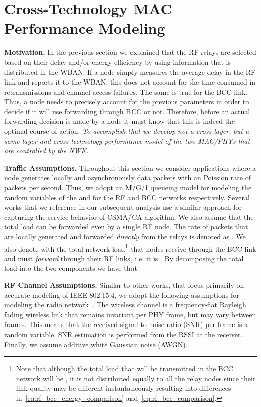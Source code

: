 \documentclass[10pt]{IEEEtran}
\newcounter{section:outage-analysis}
\begin{document}
\section{Cross-Technology MAC Performance Modeling}
\label{section:modeling-approach}
\textbf{Motivation.} In the previous section we explained that the RF relays are selected based on their delay and/or energy efficiency by using information that is distributed in the WBAN. If a node simply measures the average delay in the RF link and reports it to the WBAN, this does not account for the time consumed in retransmissions and channel access failures. The same is true for the BCC link. Thus, a node needs to precisely account for the previous parameters in order to decide if it will use forwarding through BCC or not. Therefore, before an actual forwarding decision is made by a node it must know that this is indeed the optimal course of action.
\textit{To accomplish that we develop not a cross-layer, but a same-layer and cross-technology performance model of the two MAC/PHYs that are controlled by the NWK.}

\textbf{Traffic Assumptions.} Throughout this section we consider applications where a node  generates locally and asynchronously data packets with an Poission rate of  packets per second. Thus, we adopt an M/G/1 queueing model for modeling the random variables of the  and  for the RF and BCC networks respectively. Several works that we reference in our subsequent analysis use a similar approach for capturing the service behavior of CSMA/CA algorithm. We also assume that the total load  can be forwarded even by a single RF node. The rate of packets that are locally generated and forwarded \textit{directly} from the relays is denoted as . We also denote with  the total network load\footnote{Note that although the total load that will be transmitted in the BCC network will be , it is not distributed equally to all the relay nodes since their link quality may be different instantaneously resulting into differences in~\eqref{eq:rf_bcc_energy_comparison} and~\eqref{eq:rf_bcc_comparison}.} that nodes receive through the BCC link and must \textit{forward} through their RF links, i.e. it is .  By decomposing the total load into the two components we have that 

\textbf{RF Channel Assumptions.} Similar to other works, that focus primarily on accurate modeling of IEEE 802.15.4, we adopt the following assumptions for modeling the radio network~\cite{kim2008:performance-802154}. The wireless channel is a frequency-flat Rayleigh fading wireless link that remains invariant per PHY frame, but may vary between frames. This means that the received signal-to-noise ratio (SNR)  per frame is a random variable. SNR estimation is performed from the RSSI at the receiver. Finally, we assume additive white Gaussian noise (AWGN).
\end{document}

